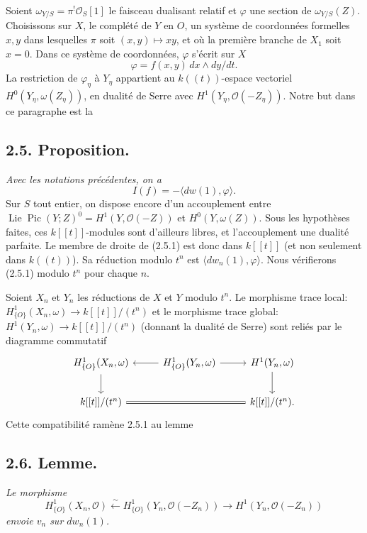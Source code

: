 \documentclass[11pt,leqno]{article}
\DeclareMathOperator{\Lie}{Lie}
\DeclareMathOperator{\Pic}{Pic}
\newcommand{\OO}{\mathcal O}
\begin{document}
Soient $\omega_{Y/S}=\pi^!\OO_S[1]$ le faisceau dualisant relatif et $\varphi$ une section de $\omega_{Y/S}(Z)$. Choisissons sur $X$, le complété de $Y$ en $O$, un système de coordonnées
\clearpage
formelles $x,y$ dans lesquelles $\pi$ soit $(x,y)\mapsto xy$, et où la première branche de $X_1$ soit $x=0$. Dans ce système de coordonnées, $\varphi$ s'écrit sur $X$
\[
        \varphi=f(x,y)\,dx\wedge dy/dt.
\]
La restriction de $\varphi_\eta$ à $Y_\eta$ appartient au $k((t))$-espace vectoriel $H^0(Y_\eta,\omega(Z_\eta))$, en dualité de Serre avec $H^1(Y_\eta,\OO(-Z_\eta))$. Notre but dans ce paragraphe est la

\subsection*{2.5. Proposition.}
\emph{Avec les notations précédentes, on a}
\begin{equation}
        I(f)=-\langle dw(1),\varphi\rangle. \tag{2.5.1}
\end{equation}
Sur $S$ tout entier, on dispose encore d'un accouplement entre $\Lie\Pic(Y;Z)^0=H^1(Y,\OO(-Z))$ et $H^0(Y,\omega(Z))$. Sous les hypothèses faites, ces $k[[t]]$-modules sont d'ailleurs libres, et l'accouplement une dualité parfaite. Le membre de droite de (2.5.1) est donc dans $k[[t]]$ (et non seulement dans $k((t))$). Sa réduction modulo $t^n$ est $\langle dw_n(1),\varphi\rangle$. Nous vérifierons (2.5.1) modulo $t^n$ pour chaque $n$.

Soient $X_n$ et $Y_n$ les réductions de $X$ et $Y$ modulo $t^n$. Le morphisme trace local: $H^1_{\{O\}}(X_n,\omega)\to k[[t]]/(t^n)$ et le morphisme trace global: $H^1(Y_n,\omega)\to k[[t]]/(t^n)$ (donnant la dualité de Serre) sont reliés par le diagramme commutatif
\[
\begin{tikzcd}[column sep=2.6em,row sep=2em]
H^1_{\{O\}}(X_n,\omega) \arrow[d] & H^1_{\{O\}}(Y_n,\omega) \arrow[l] \arrow[r] & H^1(Y_n,\omega) \arrow[d] \\
k[[t]]/(t^n) \arrow[rr,equal] & & k[[t]]/(t^n).
\end{tikzcd}
\]
Cette compatibilité ramène 2.5.1 au lemme

\subsection*{2.6. Lemme.}
\emph{Le morphisme}
\[
        H^1_{\{O\}}(X_n,\OO)\xleftarrow{\sim} H^1_{\{O\}}(Y_n,\OO(-Z_n))\longrightarrow H^1(Y_n,\OO(-Z_n))
\]
\emph{envoie $v_n$ sur $dw_n(1)$.}
\end{document}
